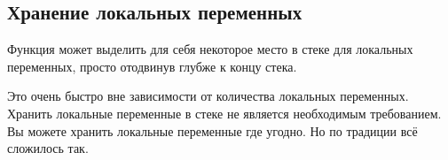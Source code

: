 \subsection{Хранение локальных переменных}

Функция может выделить для себя некоторое место в стеке для локальных переменных, просто отодвинув 
 глубже к концу стека.


Это очень быстро вне зависимости от количества локальных переменных.
Хранить локальные переменные в стеке не является необходимым требованием. 
Вы можете хранить локальные переменные где угодно. 
Но по традиции всё сложилось так.

